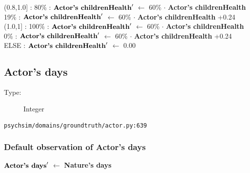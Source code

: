 \documentclass{article}%
\begin{document}
\begin{flushleft}
\hspace*{4em}%
(0.8,1.0{]}%
: %
\linebreak%
\hspace*{6em}%
80\%%
: %
$\mbox{\textbf{Actor's childrenHealth}} '$%
$\leftarrow$%
60\%%
$\cdot$%
\textbf{Actor's childrenHealth}%
\linebreak%
\hspace*{6em}%
19\%%
: %
$\mbox{\textbf{Actor's childrenHealth}} '$%
$\leftarrow$%
60\%%
$\cdot$%
\textbf{Actor's childrenHealth}%
+0.24%
\linebreak%
\hspace*{4em}%
(1.0,1{]}%
: %
\linebreak%
\hspace*{6em}%
100\%%
: %
$\mbox{\textbf{Actor's childrenHealth}} '$%
$\leftarrow$%
60\%%
$\cdot$%
\textbf{Actor's childrenHealth}%
\linebreak%
\hspace*{6em}%
0\%%
: %
$\mbox{\textbf{Actor's childrenHealth}} '$%
$\leftarrow$%
60\%%
$\cdot$%
\textbf{Actor's childrenHealth}%
+0.24%
\linebreak%
\hspace*{2em}%
ELSE %
: %
$\mbox{\textbf{Actor's childrenHealth}} '$%
$\leftarrow$%
0.00%
\end{flushleft}

%
\subsection{Actor's days}%
\label{subsec:Actor's days}%
\begin{description}%
\item[Type:]%
Integer%
\end{description}%
\begin{flushleft}%
\verb|psychsim/domains/groundtruth/actor.py:639|%
\end{flushleft}%
\subsubsection{Default observation of Actor's days}%
\label{ssubsec:Default observation of Actor's days}%
\begin{flushleft}%
$\mbox{\textbf{Actor's days}} '$%
$\leftarrow$%
\textbf{Nature's days}%
\end{flushleft}

%
\end{document}

